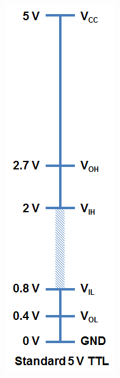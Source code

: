 \begin{figure}[H]
  \centering
  \begin{subfigure}[c]{0.15\textwidth}
    \includegraphics[width=\textwidth,frame]{TTL1}

\end{subfigure}
\end{figure}
